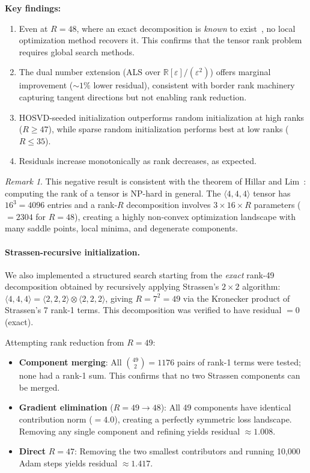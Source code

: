 \documentclass[11pt,a4paper]{article}
\theoremstyle{definition}
\theoremstyle{remark}
\newtheorem{remark}[theorem]{Remark}
\newcommand{\mmtensor}[3]{\langle #1, #2, #3 \rangle}
\begin{document}
\medskip\noindent
\textbf{Key findings:}
\begin{enumerate}
  \item Even at $R = 48$, where an exact decomposition is
        \emph{known} to exist~\cite{AlphaEvolve2025}, no local
        optimization method recovers it. This confirms that
        the tensor rank problem requires global search methods.
  \item The dual number extension (ALS over
        $\mathbb{R}[\varepsilon]/(\varepsilon^2)$) offers marginal
        improvement ($\sim\!1\%$ lower residual), consistent with
        border rank machinery capturing tangent directions but
        not enabling rank reduction.
  \item HOSVD-seeded initialization outperforms random
        initialization at high ranks ($R \ge 47$), while sparse
        random initialization performs best at low ranks ($R \le 35$).
  \item Residuals increase monotonically as rank decreases, as expected.
\end{enumerate}

\begin{remark}
This negative result is consistent with the theorem of Hillar and
Lim~\cite{HillarLim2013}: computing the rank of a tensor is NP-hard
in general. The $\mmtensor{4}{4}{4}$ tensor has $16^3 = 4096$
entries and a rank-$R$ decomposition involves $3 \times 16 \times R$
parameters ($= 2304$ for $R = 48$), creating a highly non-convex
optimization landscape with many saddle points, local minima, and
degenerate components.
\end{remark}

\paragraph{Strassen-recursive initialization.}
We also implemented a structured search starting from the
\emph{exact} rank-49 decomposition obtained by recursively applying
Strassen's $2 \times 2$ algorithm:
$\langle 4,4,4 \rangle = \langle 2,2,2 \rangle \otimes
\langle 2,2,2 \rangle$, giving $R = 7^2 = 49$ via the Kronecker
product of Strassen's 7 rank-1 terms.
This decomposition was verified to have residual $= 0$ (exact).

Attempting rank reduction from $R = 49$:
\begin{itemize}
  \item \textbf{Component merging}: All $\binom{49}{2} = 1176$ pairs
        of rank-1 terms were tested; none had a rank-1 sum. This
        confirms that no two Strassen components can be merged.
  \item \textbf{Gradient elimination} ($R = 49 \to 48$): All 49
        components have identical contribution norm ($= 4.0$),
        creating a perfectly symmetric loss landscape. Removing
        any single component and refining yields residual $\approx 1.008$.
  \item \textbf{Direct} $R = 47$: Removing the two smallest
        contributors and running 10,000 Adam steps yields
        residual $\approx 1.417$.
\end{itemize}
\end{document}
